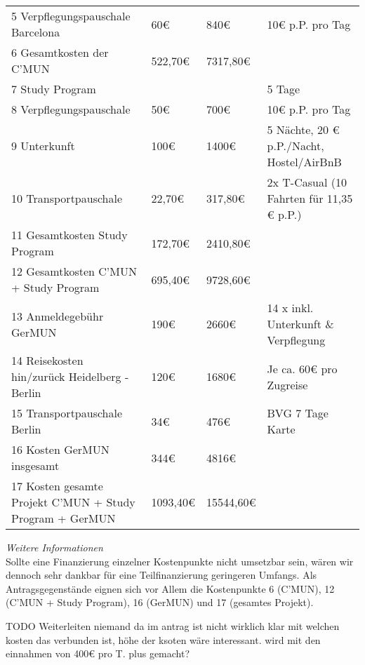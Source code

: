 {\begin{tabular}{p{4cm} p{1cm} p{1cm} p{9cm}}
        5 Verpflegungspauschale Barcelona & 60€ & 840€ & 10€ p.P. pro Tag\\
        6 Gesamtkosten der C'MUN & 522,70€ & 7317,80€ &\\
        7 Study Program & & & 5 Tage\\
        8 Verpflegungspauschale & 50€ & 700€ & 10€ p.P. pro Tag\\
        9 Unterkunft & 100€ & 1400€ & 5 Nächte, 20 € p.P./Nacht, Hostel/AirBnB\\
        10 Transportpauschale & 22,70€ & 317,80€ & 2x T-Casual (10 Fahrten für 11,35 € p.P.)\\
        11 Gesamtkosten Study Program & 172,70€ & 2410,80€ & \\
        12 Gesamtkosten C'MUN + Study Program & 695,40€ & 9728,60€ &\\
        13 Anmeldegebühr GerMUN & 190€ & 2660€ & 14 x inkl. Unterkunft \& Verpflegung\\
        14 Reisekosten hin/zurück Heidelberg - Berlin & 120€ & 1680€ & Je ca. 60€ pro Zugreise\\
        15 Transportpauschale Berlin & 34€ & 476€ & BVG 7 Tage Karte\\
        16 Kosten GerMUN insgesamt & 344€ & 4816€ &\\
        17 Kosten gesamte Projekt C'MUN + Study Program + GerMUN & 1093,40€ & 15544,60€ &\\
    \end{tabular}
    \emph{Weitere Informationen}\\
    Sollte eine Finanzierung einzelner Kostenpunkte nicht umsetzbar sein, wären wir dennoch sehr dankbar für eine Teilfinanzierung geringeren Umfangs. Als Antragsgegenstände eignen sich vor Allem die Kostenpunkte 6 (C’MUN), 12 (C’MUN + Study Program), 16 (GerMUN) und 17 (gesamtes Projekt).
}{
    TODO Weiterleiten
    niemand da
    im antrag ist nicht wirklich klar mit welchen kosten das verbunden ist, höhe der ksoten wäre interessant.
    wird mit den einnahmen von 400€ pro T. plus gemacht?
}
